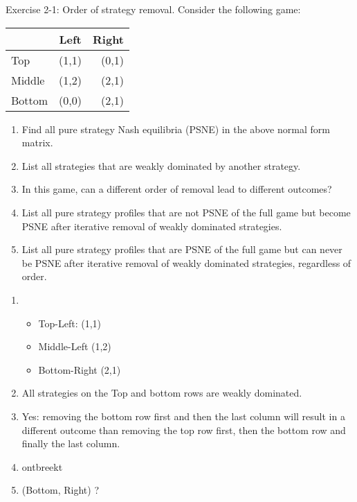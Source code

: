 \documentclass[../main.tex]{subfiles}
\begin{document}
\begin{question}
    Exercise 2-1: Order of strategy removal.
    Consider the following game:
    
    \begin{center}
	    \begin{tabular}{|l|c|r|}
	    \hline
	    & Left & Right \\
	    \hline
	    Top & (1,1) & (0,1) \\
	    \hline
	    Middle & (1,2) & (2,1) \\
	    \hline
	    Bottom & (0,0) & (2,1) \\
	    \hline
	    \end{tabular}
    \end{center}
    
    \begin{enumerate}
    	\item Find all pure strategy Nash equilibria (PSNE) in the above normal form matrix.
    	\item List all strategies that are weakly dominated by another strategy.
    	\item In this game, can a different order of removal lead to different outcomes?
    	\item List all pure strategy profiles that are not PSNE of the full game but become PSNE after iterative removal of weakly dominated strategies.
    	\item List all pure strategy profiles that are PSNE of the full game but can never be PSNE after iterative removal of weakly dominated strategies, regardless of order.
    \end{enumerate}
   
\end{question}

\begin{solution} 

    \begin{enumerate}
    	\item 
    		\begin{itemize}
	    		\item Top-Left: (1,1)
	    		\item Middle-Left (1,2)
	    		\item Bottom-Right (2,1)
    		\end{itemize}
    	\item
    		All strategies on the Top and bottom rows are weakly dominated.
    	\item Yes: removing the bottom row first and then the last column will result in a different outcome than removing the top row first, then the bottom row and finally the last column.
    	\item ontbreekt %
    	\item (Bottom, Right) ?
    \end{enumerate}
\end{solution}
\end{document}
